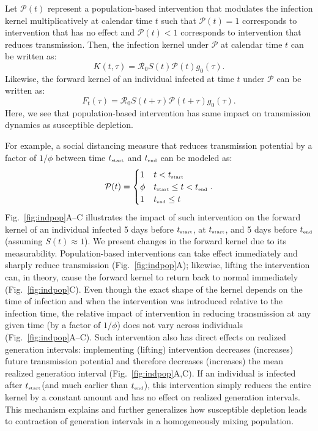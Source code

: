 \documentclass[12pt]{article}
\newcommand{\fref}[1]{Fig.~\ref{fig:#1}}
\newcommand{\Rx}[1]{\ensuremath{{\mathcal R}_{#1}}\xspace}
\newcommand{\Ro}{\Rx{0}}
\newcommand{\tsub}[2]{#1_{{\textrm{\tiny #2}}}}
\newcommand{\tstart}{\ensuremath{\tsub{t}{start}}\xspace}
\newcommand{\tend}{\ensuremath{\tsub{t}{end}}\xspace}
\newcommand{\PP}{{\mathcal P}}
\begin{document}
Let $\PP(t)$ represent a population-based intervention that modulates the infection kernel multiplicatively at calendar time $t$ such that $\PP(t)=1$ corresponds to intervention that has no effect and $\PP(t) < 1$ corresponds to intervention that reduces transmission.
Then, the infection kernel under $\PP$ at calendar time $t$ can be written as:
\begin{equation}
K(t, \tau) = \Ro S(t) \PP(t) g_0(\tau).
\end{equation}
Likewise, the forward kernel of an individual infected at time $t$ under $\PP$ can be written as:
\begin{equation}
F_t(\tau) =  \Ro S(t+\tau) \PP(t + \tau) g_0(\tau).
\end{equation}
Here, we see that population-based intervention has same impact on transmission dynamics as susceptible depletion.

For example, a social distancing measure that reduces transmission potential by a factor of $1/\phi$ between time \tstart and \tend can be modeled as:
\begin{equation}
\PP(t) = \begin{cases}
1 & t < \tstart\\
\phi & \tstart \leq t < \tend\\
1 & \tend \leq t
\end{cases}.
\end{equation}
\fref{indpop}A--C illustrates the impact of such intervention on the forward kernel of an individual infected 5 days before $\tstart$, at $\tstart$, and 5 days before $\tend$ (assuming $S(t) \approx 1$).
We present changes in the forward kernel due to its measurability.
Population-based interventions can take effect immediately and sharply reduce transmission (\fref{indpop}A);
likewise, lifting the intervention can, in theory, cause the forward kernel to return back to normal immediately (\fref{indpop}C).
Even though the exact shape of the kernel depends on the time of infection and when the intervention was introduced relative to the infection time, the relative impact of intervention in reducing transmission at any given time (by a factor of $1/\phi$) does not vary across individuals (\fref{indpop}A--C).
Such intervention also has direct effects on realized generation intervals:
implementing (lifting) intervention decreases (increases) future transmission potential and therefore decreases (increases) the mean realized generation interval (\fref{indpop}A,C).
If an individual is infected after \tstart (and much earlier than \tend), this intervention simply reduces the entire kernel by a constant amount and has no effect on realized generation intervals.
This mechanism explains and further generalizes how susceptible depletion leads to contraction of generation intervals in a homogeneously mixing population. 
\end{document}
